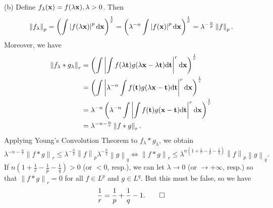 \begin{exercise}{9.2}
  (b) Define $f_{\lambda}(\mathbf{x}) = f(\lambda \mathbf{x}), \lambda > 0$.
  Then
  \[
    \left\| f_\lambda \right\|_p
    = \left( \int \left|f(\lambda \mathbf{x})\right|^p \mathrm{d} \mathbf{x} \right)^{\frac 1p}
    = \left( \lambda^{-n} \int \left|f(\mathbf{x})\right|^p \mathrm{d} \mathbf{x} \right)^{\frac 1p}
    = \lambda^{-\frac{n}{p}} \left\| f \right\|_p.
  \]
  Moreover, we have
  \[
    \begin{aligned}
      \left\| f_{\lambda}*g_{\lambda} \right\|_r
      &= \left( \int \left|
      \int f(\lambda\mathbf{t}) g(\lambda\mathbf{x}-\lambda\mathbf{t}) \mathrm{d} \mathbf{t}
      \right|^r \mathrm{d} \mathbf{x} \right)^{\frac 1r} \\
      &= \left( \int \left|
      \lambda^{-n} \int f(\mathbf{t}) g(\lambda\mathbf{x}-\mathbf{t}) \mathrm{d} \mathbf{t}
      \right|^r \mathrm{d} \mathbf{x} \right)^{\frac 1r} \\
      &= \lambda^{-n} \left( \lambda^{-n} \int \left|
      \int f(\mathbf{t}) g(\mathbf{x}-\mathbf{t}) \mathrm{d} \mathbf{t}
      \right|^r \mathrm{d} \mathbf{x} \right)^{\frac 1r} \\
      &= \lambda^{-n - \frac nr} \left\| f*g \right\|_r.
    \end{aligned}
  \]
  Applying Young's Convolution Theorem to $f_{\lambda} * g_{\lambda}$,
  we obtain
  \[
    \lambda^{-n - \frac nr} \left\| f*g \right\|_r
    \le \lambda^{-\frac n p} \left\| f \right\|_p
    \lambda^{-\frac n q} \left\| g \right\|_q
    \Longleftrightarrow
    \left\| f*g \right\|_r \le
    \lambda^{n\left( 1 + \frac1r - \frac 1p - \frac 1q \right)}
    \left\| f \right\|_p \left\| g \right\|_q.
  \]
  If $n\left( 1 + \frac1r - \frac 1p - \frac 1q \right) > 0$
  (or $<0$, resp.),
  we can let $\lambda \rightarrow 0$
  (or $\rightarrow +\infty$, resp.)
  so that $\left\| f*g \right\|_r = 0$ for all $f \in L^p$ and $g \in L^q$.
  But this must be false, so we have
  \[
    \frac{1}{r} = \frac{1}{p} + \frac{1}{q} - 1.
    \qedhere
  \]
\end{exercise}

